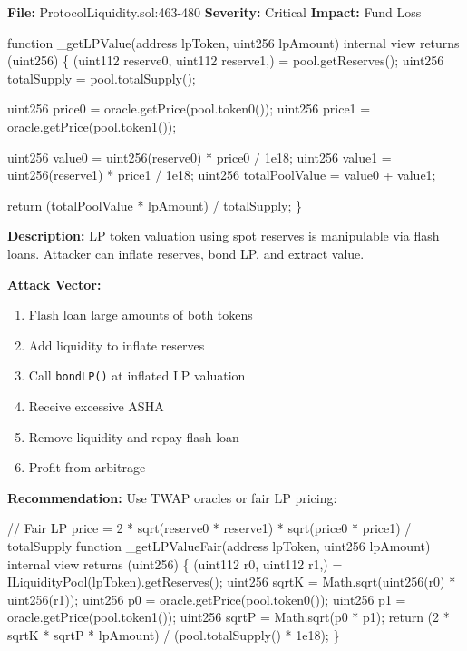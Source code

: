 \documentclass[
]{article}
\newenvironment{Shaded}{}{}
\newcommand{\NormalTok}[1]{#1}
\providecommand{\tightlist}{%
  \setlength{\itemsep}{0pt}\setlength{\parskip}{0pt}}
\begin{document}
\textbf{File:} ProtocolLiquidity.sol:463-480 \textbf{Severity:} Critical
\textbf{Impact:} Fund Loss

\begin{Shaded}
\begin{Highlighting}[]
\NormalTok{function \_getLPValue(address lpToken, uint256 lpAmount) internal view returns (uint256) \{}
\NormalTok{    (uint112 reserve0, uint112 reserve1,) = pool.getReserves();}
\NormalTok{    uint256 totalSupply = pool.totalSupply();}

\NormalTok{    uint256 price0 = oracle.getPrice(pool.token0());}
\NormalTok{    uint256 price1 = oracle.getPrice(pool.token1());}

\NormalTok{    uint256 value0 = uint256(reserve0) * price0 / 1e18;}
\NormalTok{    uint256 value1 = uint256(reserve1) * price1 / 1e18;}
\NormalTok{    uint256 totalPoolValue = value0 + value1;}

\NormalTok{    return (totalPoolValue * lpAmount) / totalSupply;}
\NormalTok{\}}
\end{Highlighting}
\end{Shaded}

\textbf{Description:} LP token valuation using spot reserves is
manipulable via flash loans. Attacker can inflate reserves, bond LP, and
extract value.

\textbf{Attack Vector:}

\begin{enumerate}
\def\labelenumi{\arabic{enumi}.}
\tightlist
\item
  Flash loan large amounts of both tokens
\item
  Add liquidity to inflate reserves
\item
  Call \texttt{bondLP()} at inflated LP valuation
\item
  Receive excessive ASHA
\item
  Remove liquidity and repay flash loan
\item
  Profit from arbitrage
\end{enumerate}

\textbf{Recommendation:} Use TWAP oracles or fair LP pricing:

\begin{Shaded}
\begin{Highlighting}[]
\NormalTok{// Fair LP price = 2 * sqrt(reserve0 * reserve1) * sqrt(price0 * price1) / totalSupply}
\NormalTok{function \_getLPValueFair(address lpToken, uint256 lpAmount) internal view returns (uint256) \{}
\NormalTok{    (uint112 r0, uint112 r1,) = ILiquidityPool(lpToken).getReserves();}
\NormalTok{    uint256 sqrtK = Math.sqrt(uint256(r0) * uint256(r1));}
\NormalTok{    uint256 p0 = oracle.getPrice(pool.token0());}
\NormalTok{    uint256 p1 = oracle.getPrice(pool.token1());}
\NormalTok{    uint256 sqrtP = Math.sqrt(p0 * p1);}
\NormalTok{    return (2 * sqrtK * sqrtP * lpAmount) / (pool.totalSupply() * 1e18);}
\NormalTok{\}}
\end{Highlighting}
\end{Shaded}
\end{document}

